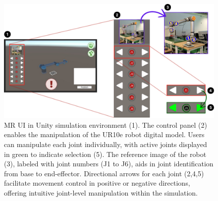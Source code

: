 \begin{figure}[h]
    \centering
    \includegraphics[width=\textwidth]{figs/interface-numerada-2.png}
    \caption{\ac{MR} \ac{UI} in Unity simulation environment (1). The control panel (2) enables the manipulation of the UR10e robot digital model. Users can manipulate each joint individually, with active joints displayed in green to indicate selection (5). The reference image of the robot (3), labeled with joint numbers (J1 to J6), aids in joint identification from base to end-effector. Directional arrows for each joint (2,4,5) facilitate movement control in positive or negative directions, offering intuitive joint-level manipulation within the simulation.}
    \label{f:ui-control}
\end{figure}

\newpage

